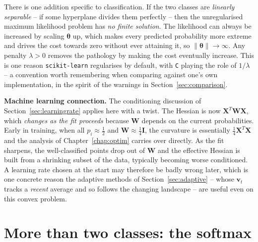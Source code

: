 There is one addition specific to classification.  If the two classes are
\emph{linearly separable} -- if some hyperplane divides them perfectly -- then
the unregularised maximum likelihood problem has \emph{no finite solution}.
The likelihood can always be increased by scaling $\bm{\theta}$ up, which
makes every predicted probability more extreme and drives the cost towards
zero without ever attaining it, so $\|\bm{\theta}\|\to\infty$.  Any penalty
$\lambda>0$ removes the pathology by making the cost eventually increase.
This is one reason \texttt{scikit-learn} regularises by default, with
\texttt{C} playing the role of $1/\lambda$ -- a convention worth remembering
when comparing against one's own implementation, in the spirit of the
warnings in Section~\ref{sec:comparison}.

\begin{notebox}
\textbf{Machine learning connection.} The conditioning discussion of
Section~\ref{sec:learningrate} applies here with a twist.  The Hessian is now
$\bm{X}^{T}\bm{W}\bm{X}$, which \emph{changes as the fit proceeds} because
$\bm{W}$ depends on the current probabilities.  Early in training, when all
$p_i\approx\tfrac12$ and $\bm{W}\approx\tfrac14\bm{I}$, the curvature is
essentially $\tfrac14\bm{X}^{T}\bm{X}$ and the analysis of
Chapter~\ref{chap:optim} carries over directly.  As the fit sharpens, the
well-classified points drop out of $\bm{W}$ and the effective Hessian is built
from a shrinking subset of the data, typically becoming worse conditioned.  A
learning rate chosen at the start may therefore be badly wrong later, which is
one concrete reason the adaptive methods of Section~\ref{sec:adaptive} --
whose $\bm{v}_t$ tracks a \emph{recent} average and so follows the changing
landscape -- are useful even on this convex problem.
\end{notebox}

\section{More than two classes: the softmax}
\label{sec:softmax}

